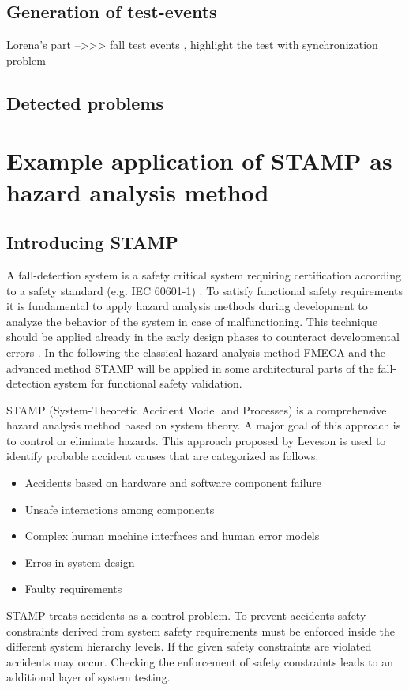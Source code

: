 \documentclass[review]{elsarticle}
\begin{document}
\subsection{Generation of test-events}
Lorena's part  -->>> fall test events , highlight the test with synchronization problem

\subsection{Detected problems}

\section{Example application of STAMP as hazard analysis method}
\label{sec:STAMP}

\subsection{Introducing STAMP}
A fall-detection system is a safety critical system requiring certification according to a safety standard (e.g. IEC 60601-1) \cite{international2005medical}. To satisfy functional safety requirements it is fundamental to apply hazard analysis methods during development to analyze the behavior of the system in case of malfunctioning. This technique should be applied already in the early design phases to counteract developmental errors \cite{STAMPThesis}. In the following the classical hazard analysis method FMECA and the advanced method STAMP will be applied in some architectural parts of the fall-detection system for functional safety validation.

STAMP (System-Theoretic Accident Model and Processes) is a comprehensive hazard analysis method based on system theory. A major goal of this approach is to control or eliminate hazards. This approach proposed by Leveson \cite{leveson2011engineering} is used to identify probable accident causes that are categorized as follows:
\begin{itemize}
	\item Accidents based on hardware and software component failure
	\item Unsafe interactions among components
	\item Complex human machine interfaces and human error models
	\item Erros in system design
	\item Faulty requirements
\end{itemize}  
STAMP treats accidents as a control problem. To prevent accidents safety constraints derived from system safety requirements must be enforced inside the different system hierarchy levels. If the given safety constraints are violated accidents may occur. Checking the enforcement of safety constraints leads to an additional layer of system testing.
\end{document}
